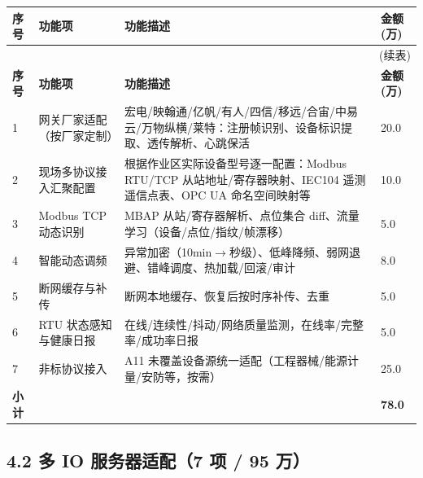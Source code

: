 \documentclass[11pt,a4paper]{ctexart}
\begin{document}
\begin{longtable}{p{1.2cm} p{3.8cm} p{7.1cm} p{1.7cm}}
\toprule
\textbf{序号} & \textbf{功能项} & \textbf{功能描述} & \textbf{金额(万)} \\
\midrule
\endfirsthead
\midrule
\multicolumn{4}{r}{(续表)} \\
\toprule
\textbf{序号} & \textbf{功能项} & \textbf{功能描述} & \textbf{金额(万)} \\
\midrule
\endhead
1 & 网关厂家适配（按厂家定制） & 宏电/映翰通/亿帆/有人/四信/移远/合宙/中易云/万物纵横/莱特：注册帧识别、设备标识提取、透传解析、心跳保活 & 20.0 \\
2 & 现场多协议接入汇聚配置 & 根据作业区实际设备型号逐一配置：Modbus RTU/TCP 从站地址/寄存器映射、IEC104 遥测遥信点表、OPC UA 命名空间映射等 & 10.0 \\
3 & Modbus TCP 动态识别 & MBAP 从站/寄存器解析、点位集合 diff、流量学习（设备/点位/指纹/帧漂移） & 5.0 \\
4 & 智能动态调频 & 异常加密（10min$\rightarrow$秒级）、低峰降频、弱网退避、错峰调度、热加载/回滚/审计 & 8.0 \\
5 & 断网缓存与补传 & 断网本地缓存、恢复后按时序补传、去重 & 5.0 \\
6 & RTU 状态感知与健康日报 & 在线/连续性/抖动/网络质量监测，在线率/完整率/成功率日报 & 5.0 \\
7 & 非标协议接入 & A11 未覆盖设备源统一适配（工程器械/能源计量/安防等，按需） & 25.0 \\
\midrule
\textbf{小计} & & & \textbf{78.0} \\
\bottomrule
\end{longtable}

\subsection{4.2 多 IO 服务器适配（7 项 / 95 万）}
\end{document}
